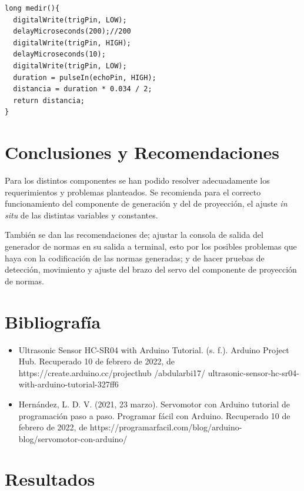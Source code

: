 \documentclass[12pt,twocolumn]{article}
\begin{document}
\begin{lstlisting}[texcl=true]
long medir(){
  digitalWrite(trigPin, LOW);
  delayMicroseconds(200);//200
  digitalWrite(trigPin, HIGH);
  delayMicroseconds(10);
  digitalWrite(trigPin, LOW);
  duration = pulseIn(echoPin, HIGH);
  distancia = duration * 0.034 / 2; 
  return distancia;
}
\end{lstlisting}
	
	
\section{Conclusiones y Recomendaciones}

Para los distintos componentes se han podido resolver adecuadamente los requerimientos y problemas planteados. Se recomienda para el correcto funcionamiento del componente de generación y del de proyección, el ajuste \textit{in situ} de las distintas variables y constantes. 

También se dan las recomendaciones de; ajustar la consola de salida del generador de normas en su salida a terminal, esto por los posibles problemas que haya con la codificación de las normas generadas; y de hacer pruebas de detección, movimiento y ajuste del brazo del servo del componente de proyección de normas.


\section{Bibliografía}

\begin{itemize}
\setlength\itemsep{-0.3em}
\item Ultrasonic Sensor HC-SR04 with Arduino Tutorial. (s. f.). Arduino Project Hub. Recuperado 10 de febrero de 2022, de https://create.arduino.cc/projecthub
/abdularbi17/
ultrasonic-sensor-hc-sr04-with-arduino-tutorial-327ff6
\item Hernández, L. D. V. (2021, 23 marzo). Servomotor con Arduino tutorial de programación paso a paso. Programar fácil con Arduino. Recuperado 10 de febrero de 2022, de https://programarfacil.com/blog/arduino-blog/servomotor-con-arduino/
\end{itemize}


\onecolumn
\section{Resultados}
%
   
\end{document}
